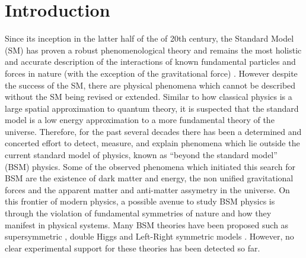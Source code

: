 \documentclass[10pt,a4paper, twoside, openright]{report}
\begin{document}
\chapter{Introduction} \label{chap:P1Intro}
Since its inception in the latter half of the of 20th century, the Standard Model (SM) has proven a robust phenomenological theory and remains the most holistic and accurate description of the interactions of known fundamental particles and forces in nature (with the exception of  the gravitational force) . However despite the success of the SM, there are  physical phenomena which cannot be described without the SM being revised or extended. Similar to how classical physics is a large spatial approximation to quantum theory, it is suspected that the standard model is a low energy approximation to a more fundamental theory of the universe.  Therefore, for the past several decades there has been a determined and concerted effort to detect, measure, and explain phenomena which lie outside the current standard model of physics, known as ``beyond the standard model'' (BSM) physics.  Some of the observed phenomena which initiated this search for BSM are the existence of dark matter and energy, the non unified gravitational forces and the apparent matter and anti-matter assymetry in the universe. On this frontier of modern physics, a possible avenue to study BSM physics is through the violation of fundamental symmetries of nature and how they manifest in physical systems. Many BSM theories have been proposed such as supersymmetric \cite{Fayet1976, Fayet1977, Pospelov2005, Ramsey2008}, double Higgs \cite{Inoue2014} and Left-Right symmetric models \cite{Pati1974}. However, no clear experimental support for these theories has been detected so far. \\
\linebreak
\end{document}

